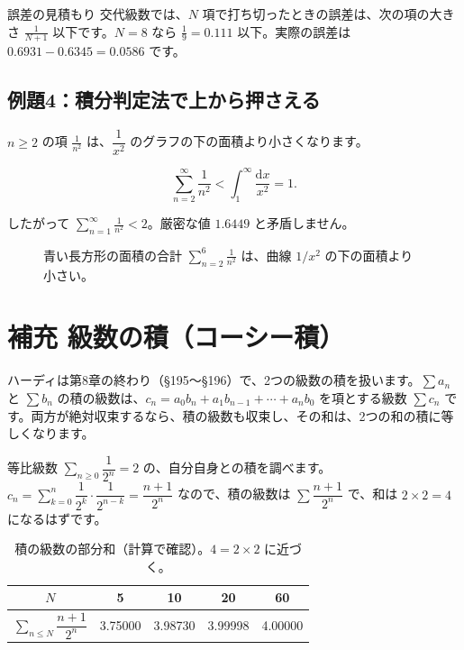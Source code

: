 \documentclass[a4paper,11pt,openany]{ltjsbook}
\newcommand{\dd}{\mathrm{d}}
\begin{document}
\begin{examplebox}{誤差の見積もり}
交代級数では、$N$ 項で打ち切ったときの誤差は、次の項の大きさ $\frac{1}{N+1}$ 以下です。$N=8$ なら $\frac19=0.111$ 以下。実際の誤差は $0.6931-0.6345=0.0586$ です。
\end{examplebox}

\subsection*{例題4：積分判定法で上から押さえる}

$n\ge2$ の項 $\frac1{n^2}$ は、$\dfrac1{x^2}$ のグラフの下の面積より小さくなります。

\[
\sum_{n=2}^{\infty}\frac1{n^2}<\int_1^\infty\frac{\dd x}{x^2}=1.
\]

したがって $\sum_{n=1}^\infty\frac1{n^2}<2$。厳密な値 $1.6449$ と矛盾しません。

\begin{figure}[htbp]
\centering
{}
\caption{青い長方形の面積の合計 $\sum_{n=2}^{6}\frac1{n^2}$ は、曲線 $1/x^2$ の下の面積より小さい。}
\end{figure}

\section{補充 級数の積（コーシー積）}

ハーディは第8章の終わり（§195〜§196）で、2つの級数の積を扱います。$\sum a_n$ と $\sum b_n$ の積の級数は、$c_n=a_0b_n+a_1b_{n-1}+\cdots+a_nb_0$ を項とする級数 $\sum c_n$ です。両方が絶対収束するなら、積の級数も収束し、その和は、2つの和の積に等しくなります。

等比級数 $\sum_{n\ge0}\dfrac1{2^n}=2$ の、自分自身との積を調べます。$c_n=\sum_{k=0}^{n}\dfrac1{2^k}\cdot\dfrac1{2^{n-k}}=\dfrac{n+1}{2^n}$ なので、積の級数は $\sum\dfrac{n+1}{2^n}$ で、和は $2\times2=4$ になるはずです。

\begin{table}[htbp]
\centering
\begin{tabular}{c|cccc}
\toprule
$N$ & 5 & 10 & 20 & 60\\
\midrule
$\sum_{n\le N}\dfrac{n+1}{2^n}$ & 3.75000 & 3.98730 & 3.99998 & 4.00000\\
\bottomrule
\end{tabular}
\caption{積の級数の部分和（計算で確認）。$4=2\times2$ に近づく。}
\end{table}
\end{document}
